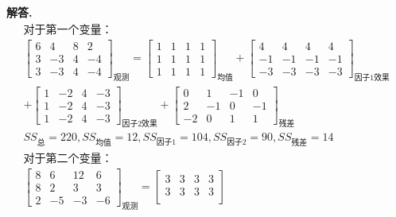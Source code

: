\documentclass[12pt, a4paper, oneside]{ctexart}
\newenvironment{solution}{\par\noindent\textbf{解答. }}{\par}
\begin{document}
\begin{solution}
     \[
     \begin{gathered}
        \text{对于第一个变量：}\\
        \begin{bmatrix}
            6 & 4 & 8 & 2 \\
            3 & -3 & 4 & -4 \\
            3 & -3 & 4 & -4 
        \end{bmatrix}_{\text{观测}}=
        \begin{bmatrix}
            1 & 1 & 1 & 1 \\
            1 & 1 & 1 & 1 \\
            1 & 1 & 1 & 1 
        \end{bmatrix}_{\text{均值}}+
        \begin{bmatrix}
            4 & 4 & 4 & 4 \\
            -1&-1&-1&-1 \\
            -3 & -3 & -3 & -3 
        \end{bmatrix}_{\text{因子1效果}}\\
        +\begin{bmatrix}
            1 & -2 & 4 & -3 \\
            1 & -2 & 4 & -3 \\
            1 & -2 & 4 & -3 
        \end{bmatrix}_{\text{因子2效果}}+
        \begin{bmatrix}
            0 & 1 & -1 & 0 \\
            2 & -1 & 0 & -1 \\
            -2 & 0 & 1 & 1
        \end{bmatrix}_{\text{残差}}\\
        {SS}_{\text{总}}=220, 
        {SS}_{\text{均值}}=12, 
        {SS}_{\text{因子1}}=104, 
        {SS}_{\text{因子2}}=90, 
        {SS}_{\text{残差}}=14\\
        \text{对于第二个变量：}\\
        \begin{bmatrix}
            8 & 6 & 12 & 6 \\
            8 & 2 & 3 & 3 \\
            2 & -5 & -3 & -6 
        \end{bmatrix}_{\text{观测}}=
        \begin{bmatrix}
           3 & 3 & 3 & 3 \\
              3 & 3 & 3 & 3 \\

\end{bmatrix}
\end{gathered}\]
\end{solution}
\end{document}
